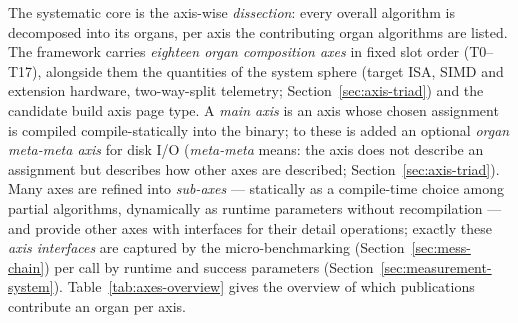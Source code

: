 \begin{nurkurz}
The systematic core is the axis-wise \emph{dissection}: every overall algorithm is decomposed into its
organs, per axis the contributing organ algorithms are listed. The framework carries \emph{eighteen organ
composition axes} in fixed slot order (T0--T17), alongside them the quantities of the system sphere (target
ISA, SIMD and extension hardware, two-way-split telemetry; Section~\ref{sec:axis-triad}) and the candidate
build axis page type. A \emph{main axis} is an axis whose chosen assignment is compiled compile-statically
into the binary; to these is added an optional \emph{organ meta-meta axis} for disk I/O (\emph{meta-meta}
means: the axis does not describe an assignment but describes how other axes are described;
Section~\ref{sec:axis-triad}). Many axes are refined into \emph{sub-axes} --- statically as a compile-time
choice among partial algorithms, dynamically as runtime parameters without recompilation --- and provide
other axes with interfaces for their detail operations; exactly these \emph{axis interfaces} are captured
by the micro-benchmarking (Section~\ref{sec:mess-chain}) per call by runtime and success parameters
(Section~\ref{sec:measurement-system}). Table~\ref{tab:axes-overview} gives the overview of which
publications contribute an organ per axis.
\end{nurkurz}

